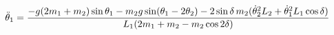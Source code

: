 \documentclass[preview]{standalone}
\begin{document}
\begin{align*}
\special{dvisvgm:raw <g id='unique000'>}\ddot{\theta}_1 = \frac{-g(2m_1+m_2)\sin\theta_1- m_2 g\sin(\theta_1-2\theta_2)- 2\sin\delta\,m_2(\dot{\theta}_2^2 L_2+\dot{\theta}_1^2 L_1\cos\delta)}{L_1(2m_1+m_2-m_2\cos 2\delta)}\special{dvisvgm:raw </g>}
\end{align*}
\end{document}
